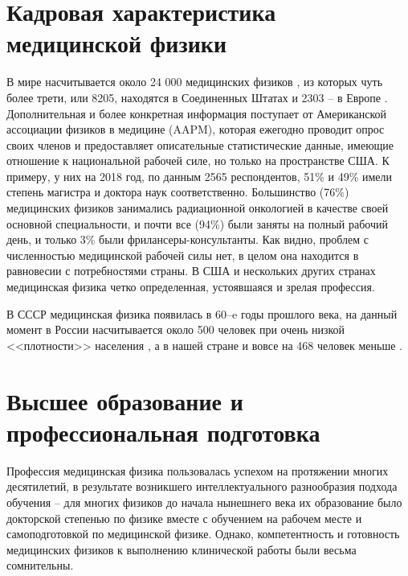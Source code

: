 \documentclass[a4paper,10pt]{extarticle}
\begin{document}



\section{Кадровая характеристика медицинской физики}

В мире насчитывается около 24 000 медицинских физиков \cite{IOMP}, из которых чуть более трети, или 8205, находятся в Соединенных Штатах \cite{AAPM1} и 2303 -- в Европе \cite{Lievens}. Дополнительная и более конкретная информация поступает от Американской ассоциации физиков в медицине (AAPM), которая ежегодно проводит опрос своих членов и предоставляет описательные статистические данные, имеющие отношение к национальной рабочей силе, но только на пространстве США. К примеру, у них на 2018 год, по данным 2565 респондентов, 51\% и 49\% имели степень магистра и доктора наук соответственно. Большинство (76\%)  медицинских физиков занимались радиационной онкологией в качестве своей основной специальности, и почти все (94\%) были заняты на полный рабочий день, и только 3\% были фрилансеры-консультанты. Как видно, проблем с численностью медицинской рабочей силы нет, в целом она находится в равновесии с потребностями страны. В США и нескольких других странах медицинская физика четко определенная, устоявшаяся и зрелая профессия. 

В СССР медицинская физика появилась в 60--e годы прошлого века, на данный момент в России насчитывается около 500 человек при очень низкой <<плотности>> населения \cite{Костылёв}, а в нашей стране и вовсе на 468 человек меньше \cite{Тарутин}.





\section{Высшее образование и профессиональная подготовка}
Профессия медицинская физика пользовалась успехом на протяжении многих десятилетий, в результате возникшего интеллектуального разнообразия подхода обучения -- для многих физиков до начала нынешнего века их образование было докторской степенью по физике вместе с обучением на рабочем месте и самоподготовкой по медицинской физике.  Однако, компетентность и готовность медицинских физиков к выполнению клинической работы были весьма сомнительны. 
\end{document}
